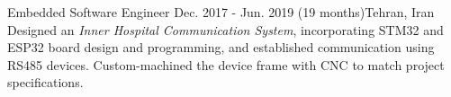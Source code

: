 \resumeSubheadingReza
{Embedded Software Engineer}{}
{Dec. 2017 - Jun. 2019 (19 months)}{Tehran, Iran}
{Designed an \textit{Inner Hospital Communication System}, incorporating STM32 and ESP32 board design and programming, and established communication using RS485 devices. Custom-machined the device frame with CNC to match project specifications.}

